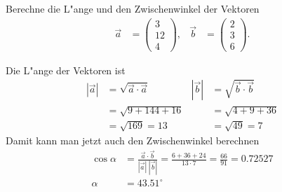 \begin{beispiel}
Berechne die L"ange und den Zwischenwinkel der Vektoren
\begin{align*}
\vec a&= \begin{pmatrix} 3\\12\\ 4 \end{pmatrix},
&
\vec b&= \begin{pmatrix}2\\3\\6\end{pmatrix}.
\end{align*}

\smallskip

{\parindent 0pt Die} L"ange der Vektoren ist
\begin{align*}
|\vec a|
&
=\sqrt{\vec a\cdot \vec a}
&
|\vec b|
&
=\sqrt{\vec b\cdot \vec b}
\\
&=\sqrt{9+144+16}
&
&=\sqrt{4+9+36}
\\
&=\sqrt{169}=13
&
&
=\sqrt{49}=7
\end{align*}
Damit kann man jetzt auch den Zwischenwinkel berechnen
\begin{align*}
\cos\alpha&= \frac{\vec a\cdot \vec b}{|\vec a|\;|\vec b|}
=
\frac{6+36+24}{13\cdot 7}=\frac{66}{91}=0.72527
\\
\alpha&=43.51^\circ
\end{align*}
\end{beispiel}

